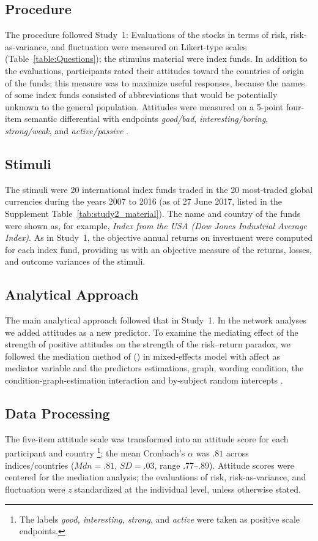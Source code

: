 \documentclass[a4paper,man, natbib,floatsintext]{apa6} %
\begin{document}
\subsection{Procedure}
The procedure followed Study~1: Evaluations of the stocks in terms of risk, risk-as-variance, and fluctuation were measured on Likert-type scales (Table~\ref{table:Questions}); the stimulus material were index funds. In addition to the evaluations, participants rated their attitudes toward the countries of origin of the funds; this measure was to maximize useful responses, because the names of some index funds consisted of abbreviations that would be potentially unknown to the general population. Attitudes were measured on a 5-point four-item semantic differential with endpoints \textit{good/bad}, \textit{interesting/boring}, \textit{strong/weak}, and \textit{active/passive} \citep{Kempf2014}.

\subsection{Stimuli}
The stimuli were 20 international index funds traded in the 20 most-traded global currencies during the years 2007 to 2016 (as of 27 June 2017, listed in the Supplement Table~\ref{tab:study2_material}). The name and country of the funds were shown as, for example, \textit{Index from the USA (Dow Jones Industrial Average Index)}. As in Study~1, the objective annual returns on investment were computed for each index fund, providing us with an objective measure of the returns, losses, and outcome variances of the stimuli.

\subsection{Analytical Approach}
The main analytical approach followed that in Study~1. In the network analyses we added attitudes as a new predictor. To examine the mediating effect of the strength of positive attitudes on the strength of the risk--return paradox, we followed the mediation method of \citeauthor{Imai2010} (\citeyear{Imai2010}) in mixed-effects model with affect as mediator variable and the predictors estimations, graph, wording condition, the condition-graph-estimation interaction and by-subject random intercepts \citep[using the R package mediation, v4.4.7;][]{tingeley2014}.

\subsection{Data Processing}
The five-item attitude scale was transformed into an attitude score for each participant and country \citep{Kempf2014a}\footnote{The labels \textit{good, interesting, strong}, and \textit{active} were taken as positive scale endpoints.}; the mean Cronbach's $\alpha$ was $.81$ across indices/countries ($Mdn =.81$, $SD=.03$, range .77--.89). Attitude scores were centered for the mediation analysis; the evaluations of risk, risk-as-variance, and fluctuation were \textit{z} standardized at the individual level, unless otherwise stated.
\end{document}
